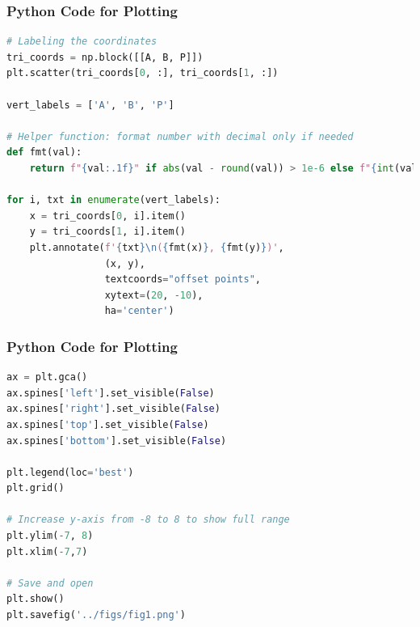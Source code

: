 \documentclass{beamer}
\theoremstyle{remark}
\numberwithin{equation}{section}
\begin{document}
\begin{frame}[fragile]
\frametitle{Python Code for Plotting}
\begin{lstlisting}[language=Python]
# Labeling the coordinates
tri_coords = np.block([[A, B, P]])
plt.scatter(tri_coords[0, :], tri_coords[1, :])

vert_labels = ['A', 'B', 'P']

# Helper function: format number with decimal only if needed
def fmt(val):
    return f"{val:.1f}" if abs(val - round(val)) > 1e-6 else f"{int(val)}"

for i, txt in enumerate(vert_labels):
    x = tri_coords[0, i].item()
    y = tri_coords[1, i].item()
    plt.annotate(f'{txt}\n({fmt(x)}, {fmt(y)})',
                 (x, y),
                 textcoords="offset points",
                 xytext=(20, -10),
                 ha='center')
\end{lstlisting}
\end{frame}

\begin{frame}[fragile]
\frametitle{Python Code for Plotting}
\begin{lstlisting}[language=Python]
ax = plt.gca()
ax.spines['left'].set_visible(False)
ax.spines['right'].set_visible(False)
ax.spines['top'].set_visible(False)
ax.spines['bottom'].set_visible(False)

plt.legend(loc='best')
plt.grid()

# Increase y-axis from -8 to 8 to show full range
plt.ylim(-7, 8)
plt.xlim(-7,7)

# Save and open
plt.show()
plt.savefig('../figs/fig1.png')
\end{lstlisting}
\end{frame}
\end{document}
